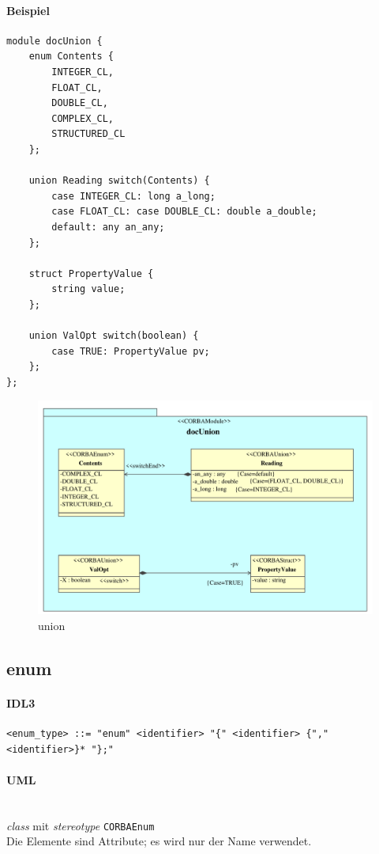 \documentclass [a4paper,10pt] {scrartcl}
\begin{document}
\paragraph{Beispiel}
\begin{verbatim}
module docUnion {
    enum Contents {
        INTEGER_CL,
        FLOAT_CL,
        DOUBLE_CL,
        COMPLEX_CL,
        STRUCTURED_CL
    };

    union Reading switch(Contents) {
        case INTEGER_CL: long a_long;
        case FLOAT_CL: case DOUBLE_CL: double a_double;
        default: any an_any;
    };

    struct PropertyValue {
        string value;
    };

    union ValOpt switch(boolean) {
        case TRUE: PropertyValue pv;
    };
};
\end{verbatim}
\begin{figure}[!h]
\centerline{\includegraphics[width=1.2 \linewidth]{docUnion}}
\caption{union}
\label{fig:union}
\end{figure}

\cleardoublepage
\subsection{enum}
\paragraph{IDL3}
\begin{verbatim}
<enum_type> ::= "enum" <identifier> "{" <identifier> {"," <identifier>}* "};"
\end{verbatim}
\paragraph{UML}~\\
\emph{class} mit \emph{stereotype} \texttt{CORBAEnum}\\
Die Elemente sind Attribute; es wird nur der Name verwendet.\\
\end{document}
